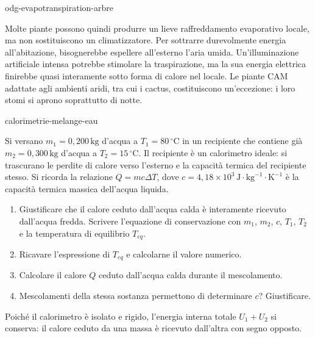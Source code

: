 \begin{exo}{odg-evapotranspiration-arbre}
\begin{solution}
Molte piante possono quindi produrre un lieve raffreddamento evaporativo locale, ma non sostituiscono un climatizzatore. Per sottrarre durevolmente energia all'abitazione, bisognerebbe espellere all'esterno l'aria umida. Un'illuminazione artificiale intensa potrebbe stimolare la traspirazione, ma la sua energia elettrica finirebbe quasi interamente sotto forma di calore nel locale. Le piante CAM adattate agli ambienti aridi, tra cui i cactus, costituiscono un'eccezione: i loro stomi si aprono soprattutto di notte.
\end{solution}
\end{exo}

\begin{exo}{calorimetrie-melange-eau}

Si versano $m_1=0{,}200\,\text{kg}$ d'acqua a $T_1=80\,^\circ\text{C}$ in un recipiente che contiene già $m_2=0{,}300\,\text{kg}$ d'acqua a $T_2=15\,^\circ\text{C}$. Il recipiente è un calorimetro ideale: si trascurano le perdite di calore verso l'esterno e la capacità termica del recipiente stesso. Si ricorda la relazione $Q=mc\Delta T$, dove $c=4{,}18\times10^3\,\text{J}\!\cdot\!\text{kg}^{-1}\!\cdot\!\text{K}^{-1}$ è la capacità termica massica dell'acqua liquida.

\begin{enumerate}
  \item Giustificare che il calore ceduto dall'acqua calda è interamente ricevuto dall'acqua fredda. Scrivere l'equazione di conservazione con $m_1$, $m_2$, $c$, $T_1$, $T_2$ e la temperatura di equilibrio $T_{eq}$.
  \item Ricavare l'espressione di $T_{eq}$ e calcolarne il valore numerico.
  \item Calcolare il calore $Q$ ceduto dall'acqua calda durante il mescolamento.
  \item Mescolamenti della stessa sostanza permettono di determinare $c$? Giustificare.
\end{enumerate}

\begin{indication}
Poiché il calorimetro è isolato e rigido, l'energia interna totale $U_1+U_2$ si conserva: il calore ceduto da una massa è ricevuto dall'altra con segno opposto.
\end{indication}


\end{exo}
